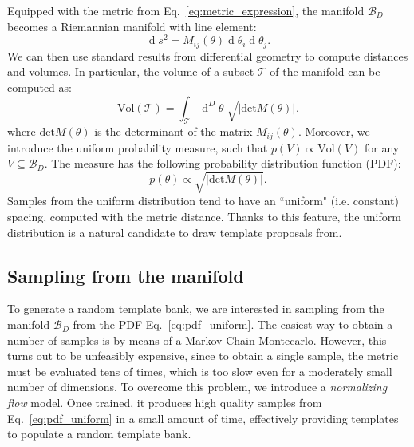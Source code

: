 \documentclass[twocolumn,showpacs,preprintnumbers,nofootinbib,prd,
superscriptaddress,10pt]{revtex4-2}
\renewcommand{\d}[1]{\ensuremath{\operatorname{d}\!{#1}}}
\newcommand{\dvol}[2]{\ensuremath{\operatorname{d}^{#2}\!{#1}}}
\begin{document}
Equipped with the metric from Eq.~\eqref{eq:metric_expression}, the manifold $\mathcal{B}_D$ becomes a Riemannian manifold with line element:
\begin{equation}\label{eq:line_element}
	\d{s^2} = M_{ij}(\theta) \d{\theta_i} \d{\theta_j}.
\end{equation}
We can then use standard results from differential geometry to compute distances and volumes. In particular, the volume of a subset $\mathcal{T}$ of the manifold can be computed as:
\begin{equation}\label{eq:volume_tile}
	\text{Vol}(\mathcal{T}) = \int_\mathcal{T} \dvol{\theta}{D} \; \sqrt{|\text{det}M(\theta)|}.
\end{equation}
where $\text{det}M(\theta)$ is the determinant of the matrix $M_{ij}(\theta)$.
%
Moreover, we introduce the uniform probability measure, such that $p(V) \propto \text{Vol}(V)$ for any $V\subseteq \mathcal{B}_D$. The measure has the following probability distribution function (PDF):
\begin{equation}\label{eq:pdf_uniform}
	p(\theta) \propto \sqrt{|\text{det}M(\theta)|}.
\end{equation}
Samples from the uniform distribution tend to have an ``uniform" (i.e. constant) spacing, computed with the metric distance. Thanks to this feature, the uniform distribution is a natural candidate to draw template proposals from.

\subsection{Sampling from the manifold} \label{sec:normalizing_flow}

To generate a random template bank, we are interested in sampling from the manifold $\mathcal{B}_D$ from the PDF Eq.~\eqref{eq:pdf_uniform}.
The easiest way to obtain a number of samples is by means of a Markov Chain Montecarlo. However, this turns out to be unfeasibly expensive, since to obtain a single sample, the metric must be evaluated tens of times, which is too slow even for a moderately small number of dimensions.
To overcome this problem, we introduce a {\it normalizing flow} model. Once trained, it produces high quality samples from Eq.~\eqref{eq:pdf_uniform} in a small amount of time, effectively providing templates to populate a random template bank.
\end{document}
